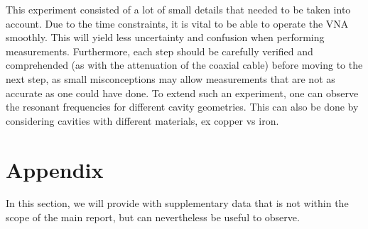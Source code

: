 \documentclass[a4paper]{report}
\numberwithin{equation}{section}
\begin{document}
This experiment consisted of a lot of small details that needed to be taken into account. Due to the time constraints, it is 
vital to be able to operate the VNA smoothly. This will yield less uncertainty and confusion when performing measurements. 
Furthermore, each step should be carefully verified and comprehended (as with the attenuation of the coaxial cable) before
moving to the next step, as small misconceptions may allow measurements that are not as accurate as one could have done. 
To extend such an experiment, one can observe the resonant frequencies for different cavity geometries. This can also be done 
by considering cavities with different materials, ex copper vs iron. 


\chapter{Appendix}

In this section, we will provide with supplementary data that is not within the scope of the main report, but can nevertheless
be useful to observe. 
\end{document}
